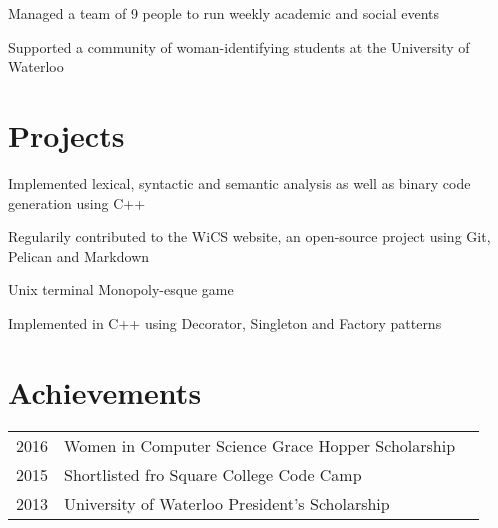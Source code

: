 \documentclass[]{deedy-resume-openfont}
\begin{document}
\begin{minipage}[t]{0.66\textwidth}
\begin{tightemize}
\item Managed a team of 9 people to run weekly academic and social events
\item Supported a community of woman-identifying students at the University of Waterloo
\end{tightemize}



\section{Projects}


\descript{}
\begin{tightemize}
\item Implemented lexical, syntactic and semantic analysis as well as binary code generation using C++
\end{tightemize}
\sectionsep

\descript{}
\begin{tightemize}
\item Regularily contributed to the WiCS website, an open-source project using Git, Pelican and Markdown
\end{tightemize}
\sectionsep

\descript{}
\begin{tightemize}
\item Unix terminal Monopoly-esque game
\item Implemented in C++ using Decorator, Singleton and Factory patterns
\end{tightemize}
\sectionsep


\section{Achievements}
\begin{tabular}{rll}
2016	     & Women in Computer Science Grace Hopper Scholarship\\
2015	     & Shortlisted fro Square College Code Camp\\
2013	     & University of Waterloo President's Scholarship\\

\end{tabular}

\end{minipage}
\end{document}
